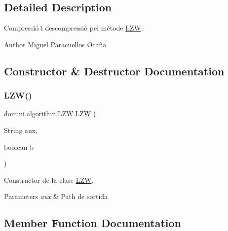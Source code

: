 \subsection{Detailed Description}
Compressió i descompressió pel mètode \hyperlink{classdomini_1_1algorithm_1_1LZW}{L\+ZW}. 

\begin{DoxyAuthor}{Author}
Miguel Paracuellos Ocaña 
\end{DoxyAuthor}


\subsection{Constructor \& Destructor Documentation}
\mbox{\label{classdomini_1_1algorithm_1_1LZW_a00bd43f0691ac9679e6232b701e535ec}} 
\subsubsection{\texorpdfstring{L\+Z\+W()}{LZW()}}
{\footnotesize\ttfamily domini.\+algorithm.\+L\+Z\+W.\+L\+ZW (\begin{DoxyParamCaption}\item[{String}]{aux,  }\item[{boolean}]{b }\end{DoxyParamCaption})\hspace{0.3cm}{\ttfamily [inline]}}



Constructor de la clase \hyperlink{classdomini_1_1algorithm_1_1LZW}{L\+ZW}. 


\begin{DoxyParams}{Parameters}
{\em aux} & Path de sortida \\
\hline
\end{DoxyParams}


\subsection{Member Function Documentation}
\mbox{\label{classdomini_1_1algorithm_1_1LZW_a79ce338289c3e8fcdd111ca029cfb45b}} 
